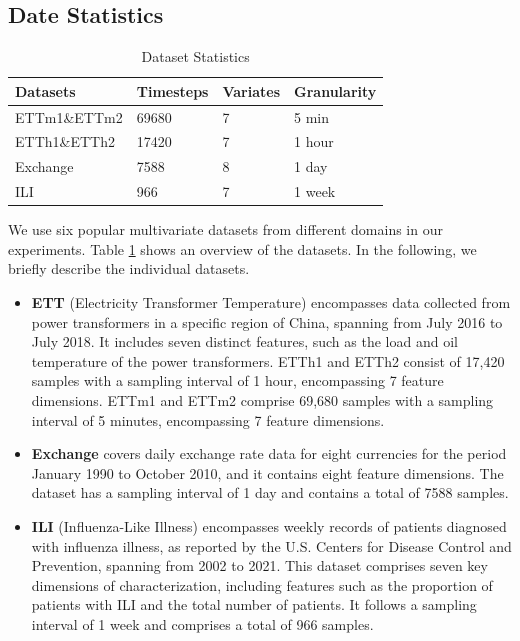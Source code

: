 \documentclass{article}
\begin{document}
\subsection{Date Statistics}\label{date_Statistics}
\begin{small}
\begin{table}[!t]
\centering
\footnotesize
\caption{Dataset Statistics}
\label{Commonly used datasets}
\begin{tabular}{p{25mm}p{18mm}p{18mm}p{20mm}}
\toprule
Datasets & Timesteps  &  Variates & Granularity \\
\midrule
ETTm1\&ETTm2 &69680   &7   &5 min  \\
\midrule
ETTh1\&ETTh2 &17420   &7  &1 hour  \\
\midrule
Exchange &7588   &8  &1 day  \\
 \midrule
ILI  &966   &7  &1 week  \\
\bottomrule
\end{tabular}
\end{table}
\end{small}


We use six popular multivariate datasets from different domains in our experiments. Table \ref{Commonly used datasets} shows an overview of the datasets. In the following, we briefly describe the individual datasets.


\begin{itemize}
    \item[$\bullet$] \textbf{ETT} (Electricity Transformer Temperature)\cite{informer}  encompasses data collected from power transformers in a specific region of China, spanning from July 2016 to July 2018. It includes seven distinct features, such as the load and oil temperature of the power transformers.  ETTh1 and ETTh2  consist of 17,420 samples with a sampling interval of 1 hour, encompassing 7 feature dimensions.  ETTm1 and ETTm2 comprise 69,680 samples with a sampling interval of 5 minutes, encompassing 7 feature dimensions.

    \item[$\bullet$] \textbf{Exchange}\cite{lstnet} covers daily exchange rate data for eight currencies for the period January 1990 to October 2010, and it contains eight feature dimensions. The dataset has a sampling interval of 1 day and contains a total of 7588 samples. 


    \item[$\bullet$]  \textbf{ILI} (Influenza-Like Illness)\cite{autoformer} encompasses weekly records of patients diagnosed with influenza illness, as reported by the U.S. Centers for Disease Control and Prevention, spanning from 2002 to 2021. This dataset comprises seven key dimensions of characterization, including features such as the proportion of patients with ILI and the total number of patients. It follows a sampling interval of 1 week and comprises a total of 966 samples. 

    
\end{itemize}
\end{document}
